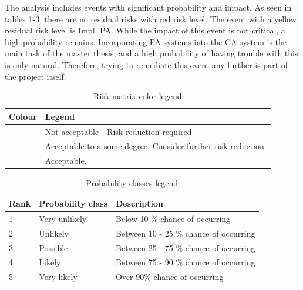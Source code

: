 \documentclass[informationsecurity]{gucmasterproject}
\begin{document}
The analysis includes events with significant probability and impact.
As seen in tables 1-3, there are no residual risks with red risk level.
The event with a yellow residual risk level is Impl. PA.
While the impact of this event is not critical, a high probability remains.
Incorporating PA systems into the CA system is the main task of the master thesis, and a high probability of having trouble with this is only natural.
Therefore, trying to remediate this event any further is part of the project itself.

\begin{table}[H]
\centering
\caption{Risk matrix color legend}
\label{tab:colour-legend}
\begin{tabular}{|p{2cm}|p{10cm}|}
\hline \bf Colour & \bf Legend \\
\hline \cellcolor{red! 50} & Not acceptable - Risk reduction required \\ [10pt]
\hline \cellcolor{yellow! 50} & Acceptable to a some degree. Consider further risk reduction. \\[10pt]
\hline \cellcolor{green! 50} & Acceptable. \\ [10pt]
\hline
\end{tabular}
\end{table}

\begin{table}[H]
\centering
\caption{Probability classes legend}
\label{tab:probability-classes}
\begin{tabular}{ p{2cm} p{3cm} p{8cm}}
\hline \bf Rank & \bf Probability class & \bf Description \\
\hline 1 & Very unlikely & Below 10 \% chance of occurring \\
2 & Unlikely & Between 10 - 25 \% chance of occurring \\
3 & Possible & Between 25 - 75 \% chance of occurring \\
4 & Likely & Between 75 - 90 \% chance of occurring \\
5 & Very likely & Over 90\% chance of occurring \\

\hline

\end{tabular}
\end{table}
\end{document}
